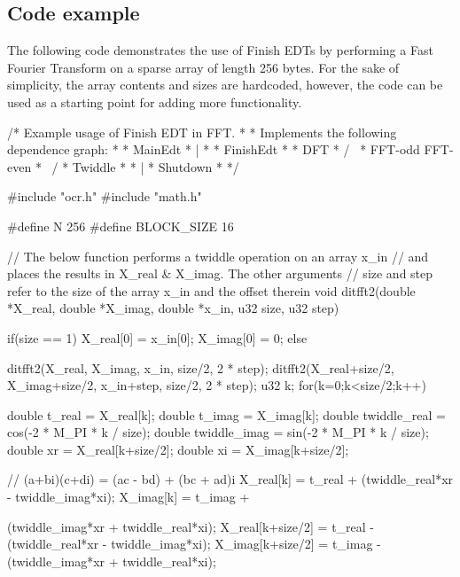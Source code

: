 \subsection{Code example}

The following code demonstrates the use of Finish EDTs by performing a Fast Fourier
Transform on a sparse array of length 256 bytes. For the sake of simplicity, the
array contents and sizes are hardcoded, however, the code can be used as a starting
point for adding more functionality.

\begin{ocrsnip}


/* Example usage of Finish EDT in FFT.
 *
 * Implements the following dependence graph:
 *
 * MainEdt
 *    |
 *
 * FinishEdt
 * {
 *       DFT
 *      /   \
 * FFT-odd FFT-even
 *      \   /
 *     Twiddle
 * }
 *    |
 * Shutdown
 *
 */

#include "ocr.h"
#include "math.h"

#define N          256
#define BLOCK_SIZE 16

// The below function performs a twiddle operation on an array x_in
// and places the results in X_real & X_imag. The other arguments
// size and step refer to the size of the array x_in and the offset therein
void ditfft2(double *X_real, double *X_imag, double *x_in, u32 size, u32 step) {
    if(size == 1) {
        X_real[0] = x_in[0];
        X_imag[0] = 0;
    } else {
        ditfft2(X_real, X_imag, x_in, size/2, 2 * step);
        ditfft2(X_real+size/2, X_imag+size/2, x_in+step, size/2, 2 * step);
        u32 k;
        for(k=0;k<size/2;k++) {
            double t_real = X_real[k];
            double t_imag = X_imag[k];
            double twiddle_real = cos(-2 * M_PI * k / size);
            double twiddle_imag = sin(-2 * M_PI * k / size);
            double xr = X_real[k+size/2];
            double xi = X_imag[k+size/2];

            // (a+bi)(c+di) = (ac - bd) + (bc + ad)i
            X_real[k] = t_real +
                (twiddle_real*xr - twiddle_imag*xi);
            X_imag[k] = t_imag +

                (twiddle_imag*xr + twiddle_real*xi);
            X_real[k+size/2] = t_real -
                (twiddle_real*xr - twiddle_imag*xi);
            X_imag[k+size/2] = t_imag -
                (twiddle_imag*xr + twiddle_real*xi);
        }
    }
}


\end{ocrsnip}
